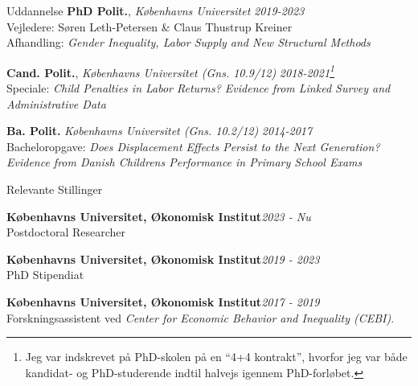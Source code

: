 \documentclass[
	11pt, %
]{resume} %
\begin{document}

\begin{rSection}{Uddannelse}
    \textbf{PhD Polit.}, \textit{Københavns Universitet} \hfill \textit{2019-2023} \\
    Vejledere: Søren Leth-Petersen \& Claus Thustrup Kreiner \\
    Afhandling: \textit{Gender Inequality, Labor Supply and New Structural Methods}

    \textbf{Cand. Polit.}, \textit{Københavns Universitet (Gns. 10.9/12)} \hfill \textit{2018-2021\footnote{Jeg var indskrevet på PhD-skolen på en ``4+4 kontrakt'', hvorfor jeg var både kandidat- og PhD-studerende indtil halvejs igennem PhD-forløbet.}} \\
    Speciale: \textit{Child Penalties in Labor Returns? Evidence from Linked Survey and Administrative Data}

    \textbf{Ba. Polit.} \textit{Københavns Universitet (Gns. 10.2/12)} \hfill \textit{2014-2017} \\
    Bacheloropgave: \textit{Does Displacement Effects Persist to the Next Generation? Evidence from Danish Childrens Performance in Primary School Exams}
\end{rSection}


\begin{rSection}{Relevante Stillinger}

    \textbf{Københavns Universitet, Økonomisk Institut}\hfill \textit{2023 - Nu} \\
    Postdoctoral Researcher

    \textbf{Københavns Universitet, Økonomisk Institut}\hfill \textit{2019 - 2023} \\
    PhD Stipendiat

    \textbf{Københavns Universitet, Økonomisk Institut}\hfill \textit{2017 - 2019} \\
    Forskningsassistent ved \textit{Center for Economic Behavior and Inequality (CEBI)}.

\end{rSection}

\end{document}
